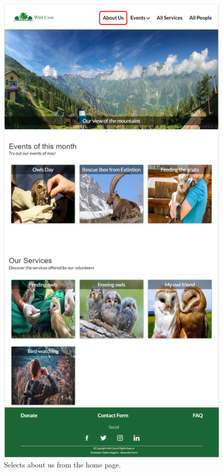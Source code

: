 \begin{figure}[h!]
\begin{minipage}[b]{0.8\textwidth}
    			\includegraphics[width= \textwidth]{./assets/mockups/homepage_aboutus.jpg}
			\caption{Selects about us from the home page.}
		\end{minipage}
	\end{figure}

